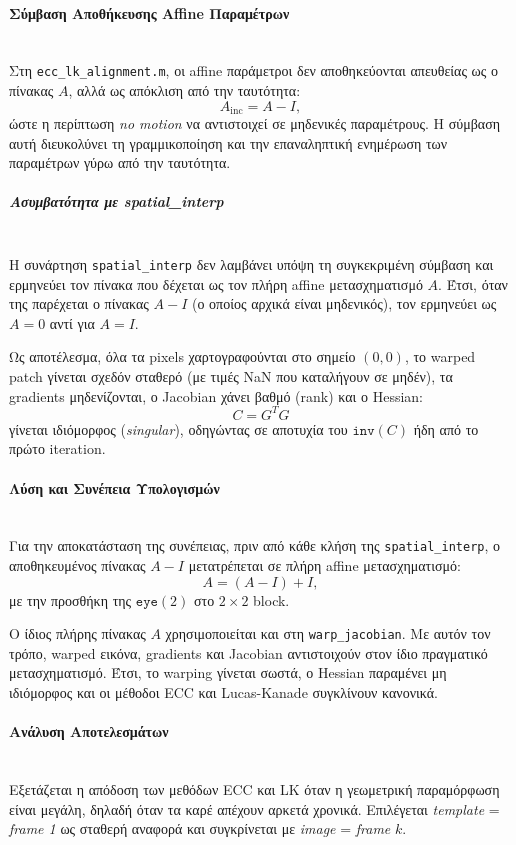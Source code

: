 \documentclass[12pt]{article}
\begin{document}
\paragraph{Σύμβαση Αποθήκευσης Affine Παραμέτρων}
\mbox{}\\
Στη \texttt{ecc\_lk\_alignment.m}, οι affine παράμετροι δεν αποθηκεύονται απευθείας ως ο πίνακας \(A\), αλλά ως απόκλιση από την ταυτότητα:
\[
A_{\text{inc}} = A - I,
\]
ώστε η περίπτωση \textit{no motion} να αντιστοιχεί σε μηδενικές παραμέτρους. Η σύμβαση αυτή διευκολύνει τη γραμμικοποίηση και την επαναληπτική ενημέρωση των παραμέτρων γύρω από την ταυτότητα.

\subparagraph{Ασυμβατότητα με spatial\_interp}
\mbox{}\\
Η συνάρτηση \texttt{spatial\_interp} δεν λαμβάνει υπόψη τη συγκεκριμένη σύμβαση και ερμηνεύει τον πίνακα που δέχεται ως τον πλήρη affine μετασχηματισμό \(A\). Έτσι, όταν της παρέχεται ο πίνακας \(A - I\) (ο οποίος αρχικά είναι μηδενικός), τον ερμηνεύει ως \(A = 0\) αντί για \(A = I\).

Ως αποτέλεσμα, όλα τα pixels χαρτογραφούνται στο σημείο \((0,0)\), το warped patch γίνεται σχεδόν σταθερό (με τιμές NaN που καταλήγουν σε μηδέν), τα gradients μηδενίζονται, ο Jacobian χάνει βαθμό (rank) και ο Hessian:
\[
C = G^T G
\]
γίνεται ιδιόμορφος (\textit{singular}), οδηγώντας σε αποτυχία του \(\texttt{inv}(C)\) ήδη από το πρώτο iteration.

\paragraph{Λύση και Συνέπεια Υπολογισμών}
\mbox{}\\
Για την αποκατάσταση της συνέπειας, πριν από κάθε κλήση της \texttt{spatial\_interp}, ο αποθηκευμένος πίνακας \(A - I\) μετατρέπεται σε πλήρη affine 
μετασχηματισμό:
\[
A = (A - I) + I,
\]
με την προσθήκη της \(\texttt{eye}(2)\) στο \(2 \times 2\) block.

Ο ίδιος πλήρης πίνακας \(A\) χρησιμοποιείται και στη \texttt{warp\_jacobian}. Με αυτόν τον τρόπο, warped εικόνα, gradients και Jacobian αντιστοιχούν 
στον ίδιο πραγματικό μετασχηματισμό. Έτσι, το warping γίνεται σωστά, ο Hessian παραμένει μη ιδιόμορφος και οι μέθοδοι ECC και Lucas-Kanade συγκλίνουν κανονικά.


\paragraph{Ανάλυση Αποτελεσμάτων}
\mbox{}\\
Εξετάζεται η απόδοση των μεθόδων ECC και LK όταν η γεωμετρική παραμόρφωση είναι μεγάλη, δηλαδή όταν τα καρέ απέχουν αρκετά χρονικά. Επιλέγεται \textit{template} = \textit{frame 1} ως σταθερή αναφορά και συγκρίνεται με \textit{image} = \textit{frame} \(k\).
\end{document}
